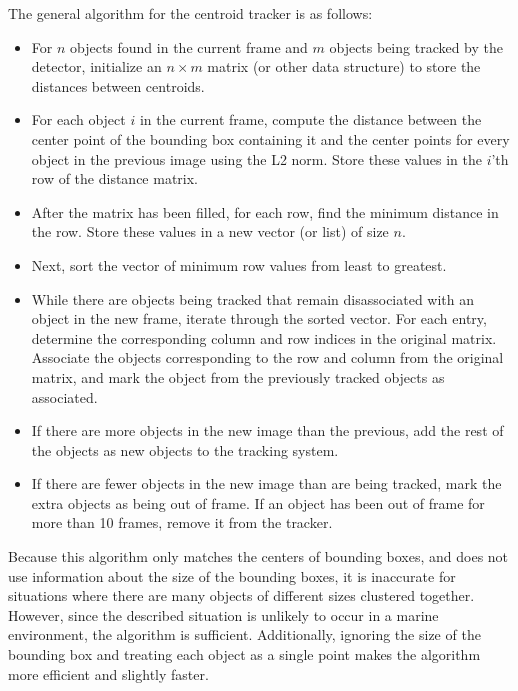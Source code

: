 \documentclass[onecolumn, draftclsnofoot,10pt, compsoc]{IEEEtran}
\begin{document}
The general algorithm for the centroid tracker is as follows:
\begin{itemize}
    \item For $n$ objects found in the current frame and $m$ objects being tracked by the detector, initialize an $n \times m$ matrix (or other data structure) to store the distances between centroids. 
    
    \item For each object $i$ in the current frame, compute the distance between the center point of the bounding box containing it and the center points for every object in the previous image using the L2 norm. Store these values in the $i$'th row of the distance matrix.
    
    \item After the matrix has been filled, for each row, find the minimum distance in the row. Store these values in a new vector (or list) of size $n$. 
    
    \item Next, sort the vector of minimum row values from least to greatest.
    
    \item While there are objects being tracked that remain disassociated with an object in the new frame, iterate through the sorted vector. For each entry, determine the corresponding column and row indices in the original matrix. Associate the objects corresponding to the row and column from the original matrix, and mark the object from the previously tracked objects as associated.
    
    \item If there are more objects in the new image than the previous, add the rest of the objects as new objects to the tracking system.
    
    \item If there are fewer objects in the new image than are being tracked, mark the extra objects as being out of frame. If an object has been out of frame for more than 10 frames, remove it from the tracker.
\end{itemize}
Because this algorithm only matches the centers of bounding boxes, and does not use information about the size of the bounding boxes, it is inaccurate for situations where there are many objects of different sizes clustered together. However, since the described situation is unlikely to occur in a marine environment, the algorithm is sufficient. Additionally, ignoring the size of the bounding box and treating each object as a single point makes the algorithm more efficient and slightly faster.
\end{document}
